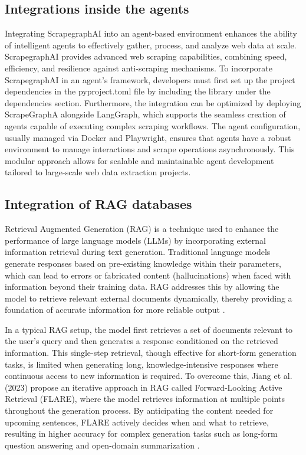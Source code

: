 \subsection{Integrations inside the agents}
Integrating ScrapegraphAI  into an agent-based environment enhances the ability of intelligent agents to effectively gather, process, and analyze web data at scale. ScrapegraphAI  provides advanced web scraping capabilities, combining speed, efficiency, and resilience against anti-scraping mechanisms. To incorporate ScrapegraphAI  in an agent's framework, developers must first set up the project dependencies in the pyproject.toml file by including the library under the dependencies section. Furthermore, the integration can be optimized by deploying ScrapeGraphA alongside LangGraph, which supports the seamless creation of agents capable of executing complex scraping workflows. The agent configuration, usually managed via Docker and Playwright, ensures that agents have a robust environment to manage interactions and scrape operations asynchronously. This modular approach allows for scalable and maintainable agent development tailored to large-scale web data extraction projects.

\subsection{Integration of RAG databases}
Retrieval Augmented Generation (RAG) is a technique used to enhance the performance of large language models (LLMs) by incorporating external information retrieval during text generation. Traditional language models generate responses based on pre-existing knowledge within their parameters, which can lead to errors or fabricated content (hallucinations) when faced with information beyond their training data. RAG addresses this by allowing the model to retrieve relevant external documents dynamically, thereby providing a foundation of accurate information for more reliable output \cite{jiang2023}.

In a typical RAG setup, the model first retrieves a set of documents relevant to the user’s query and then generates a response conditioned on the retrieved information. This single-step retrieval, though effective for short-form generation tasks, is limited when generating long, knowledge-intensive responses where continuous access to new information is required. To overcome this, Jiang et al. (2023) propose an iterative approach in RAG called Forward-Looking Active Retrieval (FLARE), where the model retrieves information at multiple points throughout the generation process. By anticipating the content needed for upcoming sentences, FLARE actively decides when and what to retrieve, resulting in higher accuracy for complex generation tasks such as long-form question answering and open-domain summarization \cite{jiang2023}.
